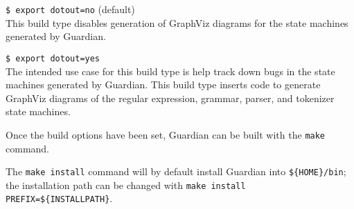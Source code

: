{\begin{itemize}
{		\item[] {\texttt{\$ export dotout=no} (default)}\\
		{
			This build type disables generation of GraphViz diagrams for the
			state machines generated by Guardian.
		}
		
		\item[] {\texttt{\$ export dotout=yes}}\\
		{
			The intended use case for this build type is help track down bugs
			in the state machines generated by Guardian. This build type
			inserts code to generate GraphViz diagrams of the
			regular expression,
			grammar, parser, and tokenizer state machines.
		}
	}
	\end{itemize}
	
	Once the build options have been set, Guardian can be built with the
	\texttt{make} command.
	
	The \texttt{make install} command will by default install Guardian into
	\texttt{\$\{HOME\}/bin}; the installation path can be changed with
	\texttt{make install PREFIX=\$\{INSTALLPATH\}}.
}
















